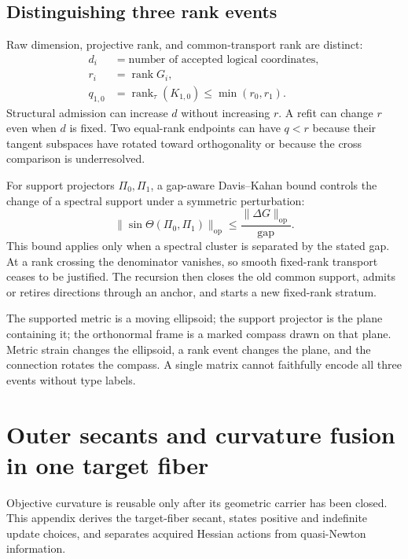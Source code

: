 \documentclass[10pt,twocolumn]{article}
\theoremstyle{definition}
\theoremstyle{remark}
\newcommand{\rank}{\operatorname{rank}}
\newcommand{\op}{\mathrm{op}}
\begin{document}
\subsection{Distinguishing three rank events}

Raw dimension, projective rank, and common-transport rank are distinct:
\begin{align}
 d_i&=\text{number of accepted logical coordinates},\nonumber\\
 r_i&=\rank G_i,\nonumber\\
 q_{1,0}&=\rank_{\tau}(K_{1,0})\le\min(r_0,r_1).
 \label{eq:appthreeranks}
\end{align}
Structural admission can increase $d$ without increasing $r$.  A refit can
change $r$ even when $d$ is fixed.  Two equal-rank endpoints can have
$q<r$ because their tangent subspaces have rotated toward orthogonality or
because the cross comparison is underresolved.

For support projectors $\Pi_0,\Pi_1$, a gap-aware Davis--Kahan bound controls
the change of a spectral support under a symmetric perturbation:
\begin{equation}
 \|\sin\Theta(\Pi_0,\Pi_1)\|_{\op}
 \le\frac{\|\Delta G\|_{\op}}{\mathrm{gap}} .
 \label{eq:appDK}
\end{equation}
This bound applies only when a spectral cluster is separated by the stated
gap.  At a rank crossing the denominator vanishes, so smooth fixed-rank
transport ceases to be justified.  The recursion then closes the old common
support, admits or retires directions through an anchor, and starts a new
fixed-rank stratum.

\begin{geombox}
The supported metric is a moving ellipsoid; the support projector is the plane
containing it; the orthonormal frame is a marked compass drawn on that plane.
Metric strain changes the ellipsoid, a rank event changes the plane, and the
connection rotates the compass.  A single matrix cannot faithfully encode all
three events without type labels.
\end{geombox}

\section{Outer secants and curvature fusion in one target fiber}
\label{app:curvaturedetails}

Objective curvature is reusable only after its geometric carrier has been
closed.  This appendix derives the target-fiber secant, states positive and
indefinite update choices, and separates acquired Hessian actions from
quasi-Newton information.
\end{document}
